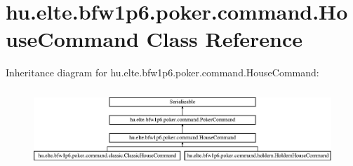 \hypertarget{classhu_1_1elte_1_1bfw1p6_1_1poker_1_1command_1_1_house_command}{}\section{hu.\+elte.\+bfw1p6.\+poker.\+command.\+House\+Command Class Reference}
\label{classhu_1_1elte_1_1bfw1p6_1_1poker_1_1command_1_1_house_command}
Inheritance diagram for hu.\+elte.\+bfw1p6.\+poker.\+command.\+House\+Command\+:\begin{figure}[H]
\begin{center}
\leavevmode
\includegraphics[height=2.970822cm]{classhu_1_1elte_1_1bfw1p6_1_1poker_1_1command_1_1_house_command}
\end{center}
\end{figure}
